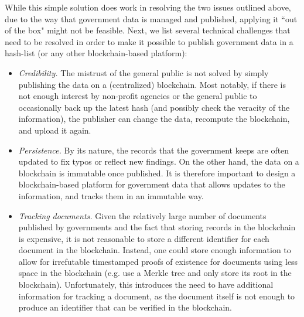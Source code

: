 While this simple solution does work in resolving the two issues outlined above, due to the way that government data is managed and published, applying it ``out of the box" might not be feasible. Next, we list several technical challenges that need to be resolved in order to make it possible to publish government data in a hash-list (or any other blockchain-based platform):
\begin{itemize}
\item {\it Credibility.} The mistrust of the general public is not solved by simply publishing the data on a (centralized) blockchain. Most notably, if there is not enough interest by non-profit agencies or the general public to occasionally back up the latest hash (and possibly check the veracity of the information), the publisher can change the data, recompute the blockchain, and upload it again. %
\item {\it Persistence.} By its nature, the records that the government keeps are often updated to fix typos or reflect new findings. On the other hand, the data on a blockchain is immutable once published. It is therefore important to design a blockchain-based platform for government data that allows updates to the information, and tracks them in an  immutable way.
\item {\it Tracking documents.}
Given the relatively large number of documents published by governments and the fact that storing records in the blockchain is expensive, it is not reasonable to store a different identifier for each document in the blockchain. Instead, one could store enough information to allow for irrefutable timestamped proofs of existence for documents using less space in the blockchain (e.g. use a Merkle tree and only store its root in the blockchain). Unfortunately, this introduces the need to have additional information for tracking a document, as the document itself is not enough to produce an identifier that can be verified in the blockchain.


\end{itemize}

